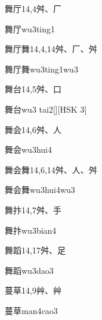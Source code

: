 \begin{entry}{舞厅}{14,4}{⾇、⼚}
  \begin{phonetics}{舞厅}{wu3ting1}
  \end{phonetics}
\end{entry}

\begin{entry}{舞厅舞}{14,4,14}{⾇、⼚、⾇}
  \begin{phonetics}{舞厅舞}{wu3ting1wu3}
  \end{phonetics}
\end{entry}

\begin{entry}{舞台}{14,5}{⾇、⼝}
  \begin{phonetics}{舞台}{wu3 tai2}[][HSK 3]
  \end{phonetics}
\end{entry}

\begin{entry}{舞会}{14,6}{⾇、⼈}
  \begin{phonetics}{舞会}{wu3hui4}
  \end{phonetics}
\end{entry}

\begin{entry}{舞会舞}{14,6,14}{⾇、⼈、⾇}
  \begin{phonetics}{舞会舞}{wu3hui4wu3}
  \end{phonetics}
\end{entry}

\begin{entry}{舞抃}{14,7}{⾇、⼿}
  \begin{phonetics}{舞抃}{wu3bian4}
  \end{phonetics}
\end{entry}

\begin{entry}{舞蹈}{14,17}{⾇、⾜}
  \begin{phonetics}{舞蹈}{wu3dao3}
  \end{phonetics}
\end{entry}

\begin{entry}{蔓草}{14,9}{⾋、⾋}
  \begin{phonetics}{蔓草}{man4cao3}
  \end{phonetics}
\end{entry}

